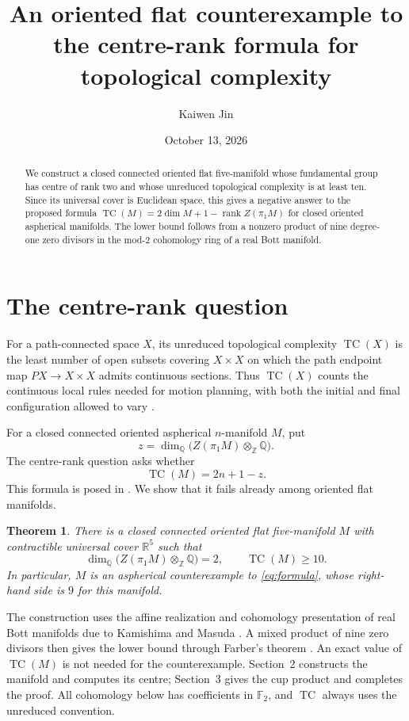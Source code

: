\documentclass[11pt]{amsart}
\title[An oriented flat counterexample]{An oriented flat counterexample to the centre-rank formula for topological complexity}
\author{Kaiwen Jin}
\date{October 13, 2026}
\newcommand{\TC}{\operatorname{TC}}
\newcommand{\rank}{\operatorname{rank}}
\newcommand{\F}{\mathbb F_2}
\newcommand{\R}{\mathbb R}
\newcommand{\Z}{\mathbb Z}
\newcommand{\Q}{\mathbb Q}
\newtheorem{theorem}{Theorem}
\begin{document}
\begin{abstract}
We construct a closed connected oriented flat five-manifold whose fundamental
group has centre of rank two and whose unreduced topological complexity is at
least ten. Since its universal cover is Euclidean space, this gives a negative
answer to the proposed formula $\TC(M)=2\dim M+1-\rank Z(\pi_1M)$ for closed
oriented aspherical manifolds. The lower bound follows from a nonzero product
of nine degree-one zero divisors in the mod-$2$ cohomology ring of a real Bott
manifold.
\end{abstract}
\maketitle

\section{The centre-rank question}
For a path-connected space $X$, its unreduced topological complexity $\TC(X)$
is the least number of open subsets covering $X\times X$ on which the path
endpoint map $PX\to X\times X$ admits continuous sections. Thus $\TC(X)$
counts the continuous local rules needed for motion planning, with both the
initial and final configuration allowed to vary \cite{Farber}.

For a closed connected oriented aspherical $n$-manifold $M$, put
\[
 z=\dim_{\Q}\bigl(Z(\pi_1M)\otimes_{\Z}\Q\bigr).
\]
The centre-rank question asks whether
\begin{equation}\label{eq:formula}
 \TC(M)=2n+1-z.
\end{equation}
This formula is posed in \cite[Question~5.8]{Neofytidis}. We show that it fails
already among oriented flat manifolds.

\begin{theorem}\label{thm:main}
There is a closed connected oriented flat five-manifold $M$ with contractible
universal cover $\R^5$ such that
\[
 \dim_{\Q}\bigl(Z(\pi_1M)\otimes_{\Z}\Q\bigr)=2,
 \qquad \TC(M)\geq 10.
\]
In particular, $M$ is an aspherical counterexample to \eqref{eq:formula},
whose right-hand side is $9$ for this manifold.
\end{theorem}

The construction uses the affine realization and cohomology presentation of
real Bott manifolds due to Kamishima and Masuda \cite{KM}. A mixed product
of nine zero divisors then gives the lower bound through Farber's theorem
\cite[Theorem~7]{Farber}. An exact value of $\TC(M)$ is not needed for the
counterexample. Section~2 constructs the manifold and computes its centre;
Section~3 gives the cup product and completes the proof. All cohomology below
has coefficients in $\F$, and $\TC$ always uses the unreduced convention.
\end{document}
